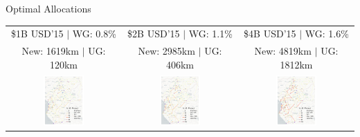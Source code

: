 \documentclass[aspectratio=169,xcolor=dvipsnames]{beamer}
\begin{document}
\begin{frame}[label=III]{Optimal Allocations \quad \hyperlink{EXP}{}}
\vspace{-1mm}
\begin{adjustbox}{center}
\begin{tabular}{@{}c@{}|@{}c@{}|@{}c@{}} 
\$1B USD'15 $|$ WG: 0.8\% & \$2B USD'15 $|$ WG: 1.1\% & \$4B USD'15 $|$ WG: 1.6\%  \\
New: 1619km $|$ UG: 120km & New: 2985km $|$ UG: 406km & New: 4819km $|$ UG: 1812km \\ 
\includegraphics[width=0.38\textwidth, trim= {0.9cm 0 0.9cm 0}, clip]{"../figures/GE/trans_africa_network_GE_add_20g_1b_fixed_cgc_sigma3.8_rho0_julia_MACR_90kmh_google_perc_ug.pdf"} & 
\includegraphics[width=0.38\textwidth, trim= {0.9cm 0 0.9cm 0}, clip]{"../figures/GE/trans_africa_network_GE_add_20g_2b_fixed_cgc_sigma3.8_rho0_julia_MACR_90kmh_google_perc_ug.pdf"} &
\includegraphics[width=0.38\textwidth, trim= {0.9cm 0 0.9cm 0}, clip]{"../figures/GE/trans_africa_network_GE_add_20g_4b_fixed_cgc_sigma3.8_rho0_julia_MACR_90kmh_google_perc_ug.pdf"}  
\end{tabular}
\end{adjustbox}
\end{frame}
\end{document}
